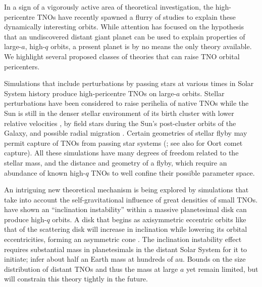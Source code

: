 \documentclass[preprint]{aastex62}
\begin{document}
In a sign of a vigorously active area of theoretical investigation, the high-pericentre TNOs have recently spawned a flurry of studies to explain these dynamically interesting orbits.
While attention has focused on the hypothesis that an undiscovered distant giant planet can be used to explain properties of large-$a$, high-$q$ orbits, a present planet is by no means the only theory available.
We highlight several proposed classes of theories that can raise TNO orbital pericenters.

Simulations that include perturbations by passing stars at various times in Solar System history produce high-pericentre TNOs on large-$a$ orbits.
Stellar perturbations have been considered to raise perihelia of native TNOs while the Sun is still in the denser stellar environment of its birth cluster with lower relative velocities \citep{Fernandez:2000, kenyonbromley04, morbidellilevison04,  Brasser:2006, KaibQuinn2008, brasser12, brasserschwamb15, Pfalzneretal2018}, by field stars during the Sun's post-cluster orbits of the Galaxy, and possible radial migration \citep{kaib11b}.
Certain geometries of stellar flyby may permit capture of TNOs from passing star systems (\citealt{kenyonbromley04,morbidellilevison04,Jilkovaetal2015}; see also \citealt{Levison:2010} for Oort comet capture).
All these simulations have many degrees of freedom related to the stellar mass, and the distance and geometry of a flyby, which require an abundance of known high-$q$ TNOs to well confine their possible parameter space.

An intriguing new theoretical mechanism is being explored by simulations that take into account the self-gravitational influence of great densities of small TNOs. \citet{madigan2016} have shown an ``inclination instability'' within a massive planetesimal disk can produce high-$q$ orbits. A disk that begins as axisymmetric eccentric orbits like that of the scattering disk will increase in inclination while lowering its orbital eccentricities, forming an asymmetric cone \citep{Madigan:2018}.
The inclination instability effect requires substantial mass in planetesimals in the distant Solar System for it to initiate; \citet{Madigan:2018} infer about half an Earth
mass at hundreds of au.  
Bounds on the size distribution of distant TNOs and thus the mass at large $a$ yet remain limited, but will constrain this theory tightly in the future.
\end{document}
